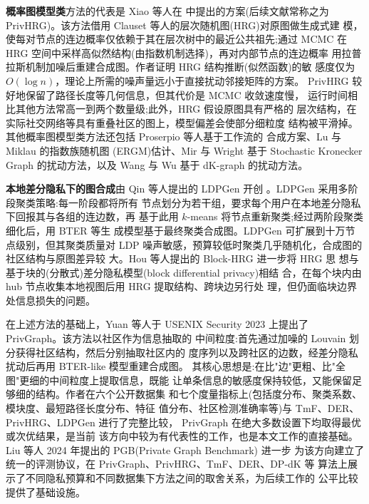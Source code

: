 \par \textbf{概率图模型类}方法的代表是 Xiao 等人在
\cite{xiao_differentially_2014} 中提出的方案(后续文献常称之为
PrivHRG)。该方法借用 Clauset 等人的层次随机图(HRG)对原图做生成式建
模，使每对节点的连边概率仅依赖于其在层次树中的最近公共祖先;通过 MCMC
在 HRG 空间中采样高似然结构(由指数机制选择)，再对内部节点的连边概率
用拉普拉斯机制加噪后重建合成图。作者证明 HRG 结构推断(似然函数)的敏
感度仅为 $O(\log n)$，理论上所需的噪声量远小于直接扰动邻接矩阵的方案。
PrivHRG 较好地保留了路径长度等几何信息，但其代价是 MCMC 收敛速度慢，
运行时间相比其他方法常高一到两个数量级;此外，HRG 假设原图具有严格的
层次结构，在实际社交网络等具有重叠社区的图上，模型偏差会使部分细粒度
结构被平滑掉。其他概率图模型类方法还包括 Proserpio 等人基于工作流的
合成方案\cite{proserpio_workflow_2014}、Lu 与 Miklau 的指数族随机图
(ERGM)估计\cite{lu_exponential_2014}、Mir 与 Wright 基于 Stochastic
Kronecker Graph 的扰动方法\cite{mir_differentially_2012}，以及 Wang 与 Wu 基于
dK-graph 的扰动方法\cite{wang_preserving_2013}。

\par \textbf{本地差分隐私下的图合成}由 Qin 等人提出的 LDPGen 开创
\cite{qin_generating_2017}。LDPGen 采用多阶段聚类策略:每一阶段都将所有
节点划分为若干组，要求每个用户在本地差分隐私下回报其与各组的连边数，再
基于此用 $k$-means 将节点重新聚类;经过两阶段聚类细化后，用 BTER 等生
成模型基于最终聚类合成图。LDPGen 可扩展到十万节点级别，但其聚类质量对
LDP 噪声敏感，预算较低时聚类几乎随机化，合成图的社区结构与原图差异较
大。Hou 等人提出的 Block-HRG\cite{gao_blockhrg_2022} 进一步将 HRG 思
想与基于块的(分散式)差分隐私模型(block differential privacy)相结
合，在每个块内由 hub 节点收集本地视图后用 HRG 提取结构、跨块边另行处
理，但仍面临块边界处信息损失的问题。

\par 在上述方法的基础上，Yuan 等人于 USENIX Security 2023 上提出了
PrivGraph\cite{yuan_privgraph_2023}。该方法以社区作为信息抽取的
中间粒度:首先通过加噪的 Louvain 划分获得社区结构，然后分别抽取社区内的
度序列以及跨社区的边数，经差分隐私扰动后再用 BTER-like 模型重建合成图。
其核心思想是:在比"边"更粗、比"全图"更细的中间粒度上提取信息，既能
让单条信息的敏感度保持较低，又能保留足够细的结构。作者在六个公开数据集
和七个度量指标上(包括度分布、聚类系数、模块度、最短路径长度分布、特征
值分布、社区检测准确率等)与 TmF、DER、PrivHRG、LDPGen 进行了完整比较，
PrivGraph 在绝大多数设置下均取得最优或次优结果，是当前
该方向中较为有代表性的工作，也是本文工作的直接基础。Liu 等人
2024 年提出的 PGB(Private Graph Benchmark)\cite{liu_pgb_2024} 进一步
为该方向建立了统一的评测协议，在 PrivGraph、PrivHRG、TmF、DER、DP-dK 等
算法上展示了不同隐私预算和不同数据集下方法之间的取舍关系，为后续工作的
公平比较提供了基础设施。

